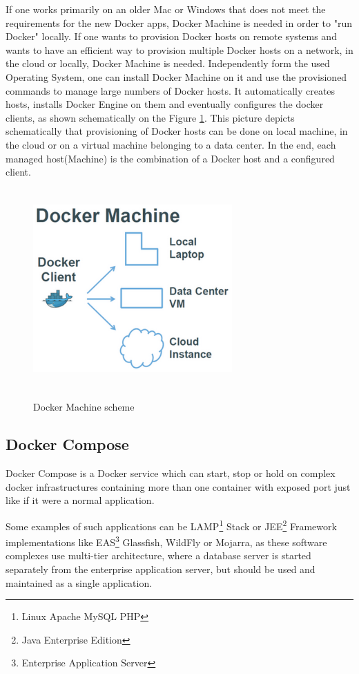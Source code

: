 If one works primarily on an older Mac or Windows that
does not meet the requirements for the new Docker apps,
Docker Machine is needed in order to "run Docker" locally.
If one wants to provision Docker hosts on remote systems and wants to have
an efficient way to provision multiple Docker hosts on a network,
in the cloud or locally, Docker Machine is needed.
Independently form the used Operating System, one can install
Docker Machine on it and use the provisioned commands to manage
large numbers of Docker hosts\cite{MTBAHeise}.
It automatically creates hosts,
installs Docker Engine on them and eventually
configures the docker clients, as shown schematically on the
Figure \ref{fig:DockerMachinePic}.
This picture depicts schematically that provisioning of Docker hosts can be done
on local machine, in the cloud or on a virtual machine belonging
to a data center. In the end, each managed
host(Machine) is the combination of a Docker host and a configured client.

\begin{figure}
\includegraphics[height=3in, width=3in]{dockerMachine}
\caption{Docker Machine scheme}
\cite{DockerMachinePic}
\label{fig:DockerMachinePic}
\end{figure}

\subsection{Docker Compose}

Docker Compose is a Docker service which can start,
stop or hold on complex docker infrastructures
containing more than one container with exposed port
just like if it were a normal application\cite{DockerCompose}.

Some examples of such applications
can be LAMP\footnote{Linux Apache MySQL PHP} Stack
or JEE\footnote{Java Enterprise Edition} Framework
implementations like EAS\footnote{Enterprise Application Server}
Glassfish, WildFly or Mojarra, as these software
complexes use multi-tier architecture, where a database server is
started separately from the enterprise application server,
but should be used and maintained as a single application.


